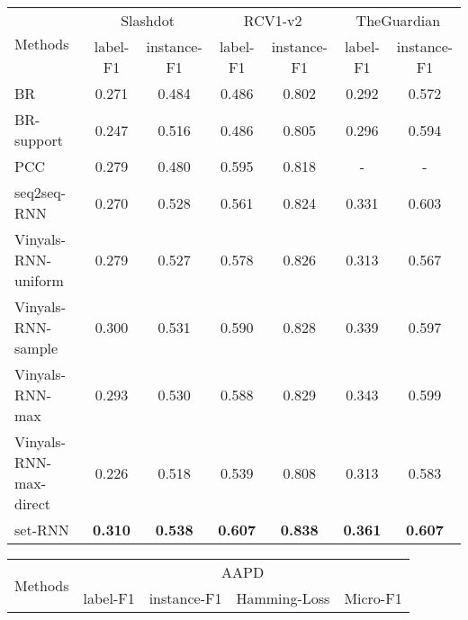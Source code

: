 \begin{table*}[ht]
	\begin{center}
		\begin{tabular}{|l|cc|cc|cc|}
			\hline
			\multirow{2}{*}{Methods}	&  
             \multicolumn{2}{c|}{Slashdot}&\multicolumn{2}{c|}{RCV1-v2}&\multicolumn{2}{c|}{TheGuardian} \\
             \cline{2-7}
           & label-F1 & instance-F1  & label-F1 & instance-F1 & label-F1 & instance-F1\\

                        \hline

            BR
            & 0.271 & 0.484 & 0.486 & 0.802 &0.292 & 0.572 \\
            BR-support
            & 0.247 & 0.516 & 0.486 & 0.805 &0.296 & 0.594 \\
            PCC 
            & 0.279 & 0.480 & 0.595 & 0.818 &- & - \\
            seq2seq-RNN  
             & 0.270 & 0.528 & 0.561 & 0.824 &0.331 & 0.603 \\
            Vinyals-RNN-uniform 
             & 0.279 & 0.527 & 0.578 & 0.826 & 0.313 & 0.567 \\
            Vinyals-RNN-sample
            & 0.300 & 0.531 & 0.590 & 0.828 & 0.339 & 0.597 \\
                        Vinyals-RNN-max
            & 0.293 & 0.530 & 0.588 & 0.829 & 0.343 & 0.599 \\
            Vinyals-RNN-max-direct
             & 0.226 & 0.518 & 0.539 & 0.808 & 0.313 & 0.583 \\
            set-RNN 
             & \textbf{0.310} & \textbf{0.538} & \textbf{0.607} & \textbf{0.838}  &\textbf{0.361} & \textbf{0.607} \\
            \hline

		\end{tabular}
        \newline
        \vspace*{0.1 cm}
        \newline
		\begin{tabular}{|l|cccc|}
			\hline
			\multirow{2}{*}{Methods}	&  
             \multicolumn{4}{c|}{AAPD} \\
             \cline{2-5}
           & label-F1 & instance-F1 & Hamming-Loss & Micro-F1 \\

                        \hline


\end{tabular}
\end{center}
\end{table*}

